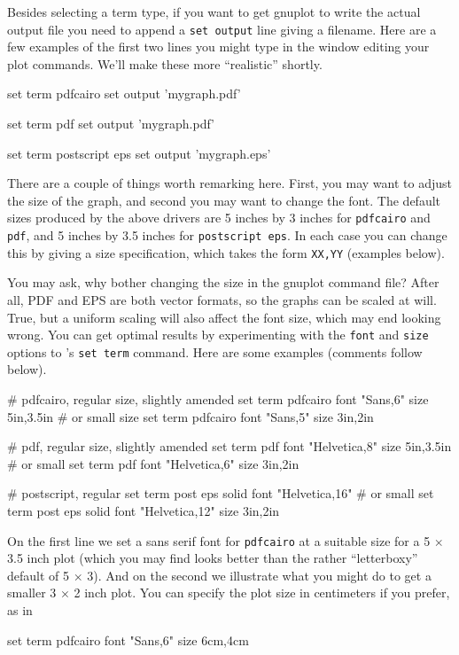 Besides selecting a term type, if you want to get gnuplot to write the
actual output file you need to append a \texttt{set output} line
giving a filename.  Here are a few examples of the first two lines you
might type in the window editing your plot commands.  We'll make
these more ``realistic'' shortly.
%
\begin{code}
set term pdfcairo
set output 'mygraph.pdf'

set term pdf
set output 'mygraph.pdf'

set term postscript eps
set output 'mygraph.eps'
\end{code}

There are a couple of things worth remarking here.  First, you may
want to adjust the size of the graph, and second you may want to
change the font.  The default sizes produced by the above drivers are
5 inches by 3 inches for \texttt{pdfcairo} and \texttt{pdf}, and 5
inches by 3.5 inches for \texttt{postscript eps}.  In each case
you can change this by giving a size specification, which takes the
form \texttt{XX,YY} (examples below).  

You may ask, why bother changing the size in the gnuplot command file?
After all, PDF and EPS are both vector formats, so the graphs can be
scaled at will.  True, but a uniform scaling will also affect the font
size, which may end looking wrong.  You can get optimal results by
experimenting with the \texttt{font} and \texttt{size} options to
's \texttt{set term} command.  Here are some examples
(comments follow below).
%
\begin{code}
# pdfcairo, regular size, slightly amended
set term pdfcairo font "Sans,6" size 5in,3.5in
# or small size
set term pdfcairo font "Sans,5" size 3in,2in

# pdf, regular size, slightly amended
set term pdf font "Helvetica,8" size 5in,3.5in
# or small
set term pdf font "Helvetica,6" size 3in,2in

# postscript, regular 
set term post eps solid font "Helvetica,16"
# or small
set term post eps solid font "Helvetica,12" size 3in,2in
\end{code}

On the first line we set a sans serif font for \texttt{pdfcairo} at a
suitable size for a 5 $\times$ 3.5 inch plot (which you may find looks
better than the rather ``letterboxy'' default of 5 $\times$ 3).  And
on the second we illustrate what you might do to get a smaller 3
$\times$ 2 inch plot. You can specify the plot size in centimeters
if you prefer, as in
\begin{code}
set term pdfcairo font "Sans,6" size 6cm,4cm
\end{code}

